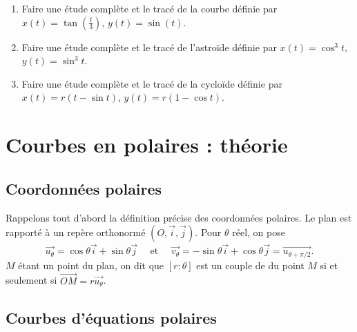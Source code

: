 \documentclass[class=report,crop=false]{standalone}
\begin{document}
\begin{miniexercices}
\sauteligne
\begin{enumerate}
  \item  Faire une étude complète et le tracé de la courbe définie par
  $x(t) = \tan \left(\frac t 3\right)$,  $y(t) = \sin (t)$.

  \item Faire une étude complète et le tracé de
  l'astroïde définie par $x(t) = \cos^3 t$,  $y(t) = \sin^3 t$.


  \item Faire une étude complète et le tracé de
  la cycloïde définie par   $x(t) = r(t-\sin t)$,  $y(t) = r(1-\cos t)$.
\end{enumerate}
\end{miniexercices}


\section{Courbes en polaires : théorie}
\subsection{Coordonnées polaires}

Rappelons tout d'abord la définition précise des coordonnées polaires.
Le plan est rapporté à un repère orthonormé
$(O,\overrightarrow{i},\overrightarrow{j})$. Pour $\theta$ réel,
on pose
$$\overrightarrow{u_\theta}=\cos\theta\overrightarrow{i}+\sin\theta\overrightarrow{j}
\quad \text{ et  } \quad
\overrightarrow{v_\theta}=-\sin\theta\overrightarrow{i}+\cos\theta\overrightarrow{j}
=\overrightarrow{u_{\theta+\pi/2}}.$$
$M$ étant un point du plan, on dit que $[r:\theta]$ est un
couple de  du point $M$ si et seulement
si $\overrightarrow{OM}=r\overrightarrow{u_\theta}$.






\subsection{Courbes d'équations polaires}
\end{document}
